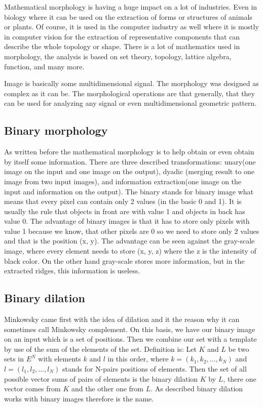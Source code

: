 Mathematical morphology is having a huge impact on a lot of industries. Even in biology where it can be used on the extraction of forms or structures of animals or plants. Of course, it is used in the computer industry as well where it is mostly in computer vision for the extraction of representative components that can describe the whole topology or shape. There is a lot of mathematics used in morphology, the analysis is based on set theory, topology, lattice algebra, function, and many more.\cite{shih2009image}

Image is basically some multidimensional signal. The morphology was designed as complex as it can be. The morphological operations are that generally, that they can be used for analyzing any signal or even multidimensional geometric pattern.\cite{shih2009image}

\subsection{Binary morphology}
As written before the mathematical morphology is to help obtain or even obtain by itself some information. There are three described transformations: unary(one image on the input and one image on the output), dyadic (merging result to one image from two input images), and information extraction(one image on the input and information on the output). The binary stands for binary image what means that every pixel can contain only 2 values (in the basic 0 and 1). It is usually the rule that objects in front are with value 1 and objects in back has value 0. The advantage of binary images is that it has to store only pixels with value 1 because we know, that other pixels are 0 so we need to store only 2 values and that is the position (x, y). The advantage can be seen against the gray-scale image, where every element needs to store (x, y, z) where the z is the intensity of black color. On the other hand gray-scale stores more information, but in the extracted ridges, this information is useless.\cite{shih2009image}

\subsection{Binary dilation}
Minkowsky came first with the idea of dilation and it the reason why it can sometimes call Minkowsky complement. On this basis, we have our binary image on an input which is a set of positions. Then we combine our set with a template by use of the sum of the elements of the set. Definition is: Let $K$ and $L$ be two sets in $E^N$ with elements $k$ and $l$ in this order, where $k = (k_1, k_2, ..., k_N)$ and $l = (l_1, l_2, ..., l_N )$ stands for N-pairs positions of elements. Then the set of all possible vector sums of pairs of elements is the binary dilation $K$ by $L$, there one vector comes from $K$ and the other one from $L$. As described binary dilation works with binary images therefore is the name.\cite{shih2009image}


